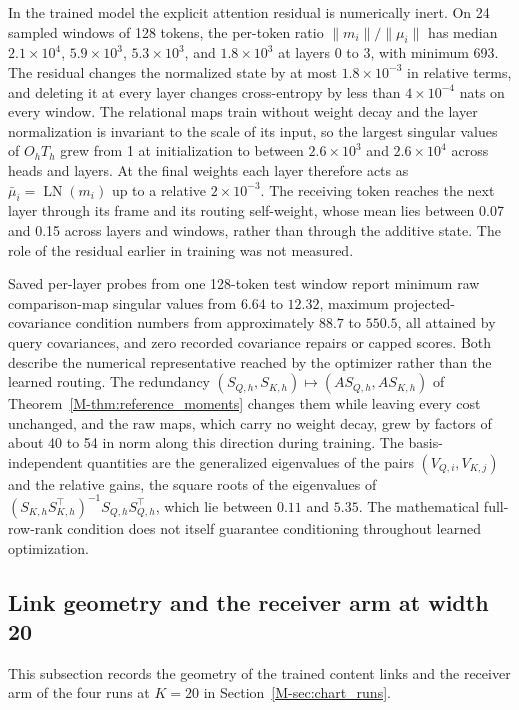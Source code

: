 \documentclass[twoside,11pt]{article}
\begin{document}
In the trained model the explicit attention residual is numerically inert. On 24 sampled windows of 128 tokens, the per-token ratio $\|m_i\|/\|\mu_i\|$ has median $2.1\times10^4$, $5.9\times10^3$, $5.3\times10^3$, and $1.8\times10^3$ at layers 0 to 3, with minimum 693. The residual changes the normalized state by at most $1.8\times10^{-3}$ in relative terms, and deleting it at every layer changes cross-entropy by less than $4\times10^{-4}$ nats on every window. The relational maps train without weight decay and the layer normalization is invariant to the scale of its input, so the largest singular values of $O_hT_h$ grew from 1 at initialization to between $2.6\times10^3$ and $2.6\times10^4$ across heads and layers. At the final weights each layer therefore acts as $\bar\mu_i=\operatorname{LN}(m_i)$ up to a relative $2\times10^{-3}$. The receiving token reaches the next layer through its frame and its routing self-weight, whose mean lies between 0.07 and 0.15 across layers and windows, rather than through the additive state. The role of the residual earlier in training was not measured.

Saved per-layer probes from one 128-token test window report minimum raw comparison-map singular values from $6.64$ to $12.32$, maximum projected-covariance condition numbers from approximately $88.7$ to $550.5$, all attained by query covariances, and zero recorded covariance repairs or capped scores. Both describe the numerical representative reached by the optimizer rather than the learned routing. The redundancy $(S_{Q,h},S_{K,h})\mapsto(AS_{Q,h},AS_{K,h})$ of Theorem~\ref{M-thm:reference_moments} changes them while leaving every cost unchanged, and the raw maps, which carry no weight decay, grew by factors of about 40 to 54 in norm along this direction during training. The basis-independent quantities are the generalized eigenvalues of the pairs $(V_{Q,i},V_{K,j})$ and the relative gains, the square roots of the eigenvalues of $(S_{K,h}S_{K,h}^\top)^{-1}S_{Q,h}S_{Q,h}^\top$, which lie between $0.11$ and $5.35$. The mathematical full-row-rank condition does not itself guarantee conditioning throughout learned optimization.

\subsection{Link geometry and the receiver arm at width 20}
\label{supp:chart_geometry}

This subsection records the geometry of the trained content links and the receiver arm of the four runs at $K=20$ in Section~\ref{M-sec:chart_runs}.
\end{document}
